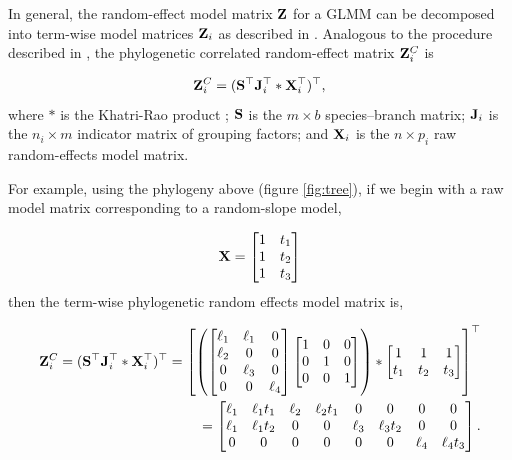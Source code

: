 \documentclass[12pt]{article}
\begin{document}
In general, the random-effect model matrix ${\mathbf Z}$ for a GLMM can be decomposed into term-wise model matrices ${\mathbf Z}_{i}$ as described in \citet{bates2015fitting}.
Analogous to the procedure described in \citet{bates2015fitting}, the phylogenetic correlated random-effect matrix ${\mathbf Z}^{C}_{i}$ is

\begin{equation}
{\mathbf Z}^{C}_{i} = ({\mathbf S}^{\top}{\mathbf J}^{\top}_{i} \ast {\mathbf X}^{\top}_{i})^{\top}, \label{eq:ZC}
\end{equation}
where $\ast$ is the Khatri-Rao product \citep{khatri1968solutions}; ${\mathbf S}$ is the $m \times b$ species--branch matrix; ${\mathbf J}_{i}$ is the $n_i \times m$ indicator matrix of grouping factors; and ${\mathbf X}_{i}$ is the $n \times p_{i}$ raw random-effects model matrix. 

For example, using the phylogeny above (figure \ref{fig:tree}), if we begin with a raw model matrix corresponding to a random-slope model, 

\[
{\mathbf X} = \begin{bmatrix}
1 & t_1  \\ 
1 & t_2  \\ 
1 & t_3 
\end{bmatrix} 
\]
then the term-wise phylogenetic random effects model matrix is,

\begin{equation}
\begin{aligned}
{\mathbf Z}^{C}_{i} = ({\mathbf S}^{\top}{\mathbf J}^{\top}_{i} \ast {\mathbf X}^{\top}_{i})^{\top} =
\left[
\left(
\begin{bmatrix}
\ell_{1} & \ell_{1}  & 0 \\
\ell_{2} &  0  & 0 \\
0  &  \ell_{3} & 0 \\
0 & 0 &  \ell_{4} 
\end{bmatrix}
\begin{bmatrix}
1 & 0  & 0 \\
0 & 1  & 0 \\
0 & 0  & 1  
\end{bmatrix}
\right)
\ast
\begin{bmatrix}
1   & 1   & 1  \\ 
t_1 & t_2 & t_3
\end{bmatrix} 
\right]^{\top}
\\
= \begin{bmatrix}
\ell_{1} & \ell_{1}t_1 & \ell_{2} & \ell_{2}t_1 & 0 & 0 & 0 & 0 \\
\ell_{1} & \ell_{1}t_2 & 0 & 0 & \ell_{3} & \ell_{3}t_2 & 0 & 0 \\
0 & 0 & 0 & 0 & 0 & 0 & \ell_{4} & \ell_{4}t_3
\end{bmatrix}.
\end{aligned}
\end{equation}
\end{document}
